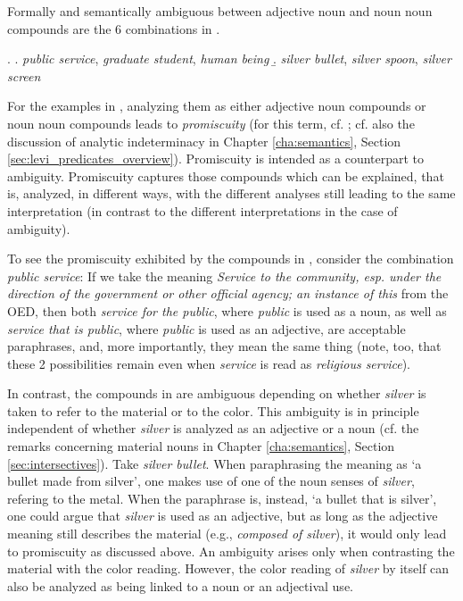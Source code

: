 Formally and semantically ambiguous
between adjective noun and noun noun compounds are the 6 combinations
in \Next.

\ex. \a. \label{ex:promiscuous} \emph{public service}, \emph{graduate student}, \emph{human
  being} 
\b. \emph{silver bullet}, \emph{silver spoon}, \emph{silver screen}

For the examples in \Last[a], analyzing them as either adjective noun compounds or noun noun
compounds leads to \emph{promiscuity} (for this term,
cf. \citealt[427--428]{Jackendoff:2010}; cf. also the discussion of analytic indeterminacy in Chapter \ref{cha:semantics}, Section \ref{sec:levi_predicates_overview}). 
Promiscuity is
intended as a counterpart to ambiguity. Promiscuity captures
those compounds which can be explained, that is, analyzed, in
different ways, with the different analyses still leading to
the same interpretation (in contrast to the different interpretations in
the case of ambiguity). 

To see the promiscuity exhibited by the compounds in \Last[a],
consider the combination \emph{public service}: If we take the meaning \emph{Service to the community,
  esp. under the direction of the government or other official agency;
  an instance of this} from the OED, 
then both \emph{service for the public}, where \emph{public} is used as
a noun,
as well as \emph{service that is public}, where \emph{public} is used
as an adjective, are acceptable paraphrases,
and, more importantly, they mean the same thing (note, too, that these 2 possibilities remain even when \emph{service}
is read as \emph{religious service}).

In contrast, the compounds in \Last[b] are ambiguous depending on
whether \emph{silver} is taken to refer to the material or to the color. This
ambiguity is in principle independent of whether \emph{silver} is
analyzed as an adjective or a noun (cf. the remarks concerning
material nouns in Chapter \ref{cha:semantics}, Section
\ref{sec:intersectives}).
 Take \emph{silver bullet}. When
paraphrasing the meaning as `a bullet made from silver', one makes use
of one of the noun senses of \emph{silver}, refering to the
metal. When the paraphrase is, instead, `a bullet that is silver', one could
argue that \emph{silver} is used as an adjective, but as long as the
adjective meaning still describes the material (e.g., \emph{composed
  of silver}), it would only lead to promiscuity as discussed
above. An ambiguity arises only when contrasting the material
with the color reading. However, the color reading of \emph{silver} by
itself can also be analyzed as being linked to a noun or an adjectival
use.

